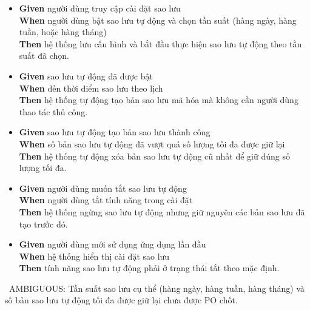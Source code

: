 \begin{itemize}
\item \textbf{Given} người dùng truy cập cài đặt sao lưu  \\ \hspace*{1.5em}  \textbf{When} người dùng bật sao lưu tự động và chọn tần suất (hàng ngày, hàng tuần, hoặc hàng tháng)  \\ \hspace*{1.5em}  \textbf{Then} hệ thống lưu cấu hình và bắt đầu thực hiện sao lưu tự động theo tần suất đã chọn.
\item \textbf{Given} sao lưu tự động đã được bật  \\ \hspace*{1.5em}  \textbf{When} đến thời điểm sao lưu theo lịch  \\ \hspace*{1.5em}  \textbf{Then} hệ thống tự động tạo bản sao lưu mã hóa mà không cần người dùng thao tác thủ công.
\item \textbf{Given} sao lưu tự động tạo bản sao lưu thành công  \\ \hspace*{1.5em}  \textbf{When} số bản sao lưu tự động đã vượt quá số lượng tối đa được giữ lại  \\ \hspace*{1.5em}  \textbf{Then} hệ thống tự động xóa bản sao lưu tự động cũ nhất để giữ đúng số lượng tối đa.
\item \textbf{Given} người dùng muốn tắt sao lưu tự động  \\ \hspace*{1.5em}  \textbf{When} người dùng tắt tính năng trong cài đặt  \\ \hspace*{1.5em}  \textbf{Then} hệ thống ngừng sao lưu tự động nhưng giữ nguyên các bản sao lưu đã tạo trước đó.
\item \textbf{Given} người dùng mới sử dụng ứng dụng lần đầu  \\ \hspace*{1.5em}  \textbf{When} hệ thống hiển thị cài đặt sao lưu  \\ \hspace*{1.5em}  \textbf{Then} tính năng sao lưu tự động phải ở trạng thái tắt theo mặc định.
\end{itemize}
\warningicon\  AMBIGUOUS: Tần suất sao lưu cụ thể (hàng ngày, hàng tuần, hàng tháng) và số bản sao lưu tự động tối đa được giữ lại chưa được PO chốt.




